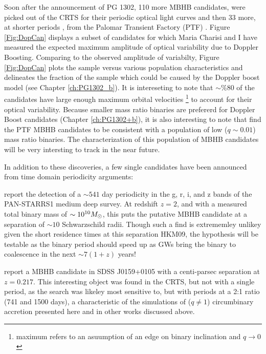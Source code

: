 Soon after the announcement of PG 1302, 110 more MBHB candidates, were picked
out of the CRTS for their periodic optical light curves \citep{Graham+2015b}
and then 33 more, at shorter periods \citep{Charisi+2016}, from the Palomar
Transient Factory (PTF) \citep{PTF}. Figure \ref{Fig:DopCan} displays a subset
of candidates for which Maria Charisi and I have measured the expected maximum
amplitude of optical variability due to Doppler Boosting. Comparing to the
observed amplitude of variabilty, Figure \ref{Fig:DopCan} plots the sample
versus various population characteristics and delineates the fraction of the
sample which could be caused by the Doppler boost model (see Chapter
\ref{ch:PG1302_b}). It is intereseting to note that $\sim \% 80$ of the
candidates have large enough maximum orbital velocities \footnote{maximum
refers to an asuumption of an edge on binary inclination and $q \rightarrow
0$} to account for their optical variability. Because smaller mass ratio
binaries are prefererd for Doppler Boost candidates (Chapter
\ref{ch:PG1302+b}), it is also interesting to note that \citep{Charisi+2016}
find the PTF MBHB candidates to be consistent with a population of low
($q\sim0.01$) mass ratio binaries. The characterization of this population of
MBHB candidates will be very intersting to track in the near future.


In addition to these discoveries, a few single candidates have been announced
from time domain periodicity arguments: 

\citep{Liu:7pc:2015} report the detection of a $\sim 541$ day periodicity in
the g, r, i, and z bands of the PAN-STARRS1 medium deep survey. At redshift
$z=2$, and with a measured total binary mass of $\sim 10^{10} {M_{\odot}}$, this
puts the putative MBHB candidate at a separation of $\sim10$ Schwarzschild
radii. Though such a find is extrememley unlikey given the short residence
times at this separation HKM09, the hypothesis will be testable as the binary
period should speed up as GWs bring the binary to coalescence in the next
$\sim 7 (1+z)$ years!


\citep{Zheng:MBHB_2P:2015} report a MBHB candidate in SDSS J0159+0105 with a
centi-parsec separation at $z=0.217$. This interesting object was found in the
CRTS, but not with a single period, as the \citep{Graham+2015b} search was
likeley most sensitive to, but with periods at a 2:1 ratio (741 and 1500
days), a characteristic of the simulations of ($q \neq 1$) circumbinary
accretion presented here and in other works discussed above.


